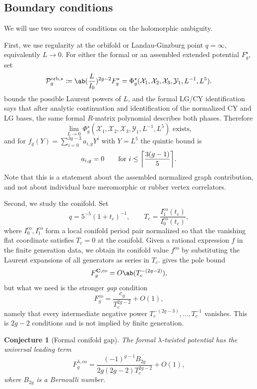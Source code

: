 \documentclass{amsart}
\newtheorem{conj}[thm]{Conjecture}
\theoremstyle{definition}
\theoremstyle{remark}
\theoremstyle{plain}
\theoremstyle{definition}
\theoremstyle{remark}
\DeclarePairedDelimiter{\ceil}{\lceil}{\rceil}
\newcommand{\mc}[1]{\mathcal{#1}}
\newcommand{\mbf}[1]{\mathbf{#1}}
\newcommand{\mr}[1]{\mathrm{#1}}
\newcommand{\1}{\mathbf{1}}
\newcommand{\2}{\mathbf{2}}
\newcommand{\3}{\mathbf{3}}
\begin{document}
\subsection{Boundary conditions}%
\label{sub:Boundary conditions}

We will use two sources of conditions on the holomorphic ambiguity.

First, we use regularity at the orbifold or Landau-Ginzburg point \(q = \infty\), equivalently \(L \to 0\). For either the formal or an assembled extended potential \(F_g^{\star}\), set
\[ \mc{P}_g^{\mr{orb},\star} \coloneqq \ab(\frac{L}{I_0})^{2g-2}F_g^{\star} = \Phi_g^{\star}(\mc{X}_1,\mc{X}_2,\mc{X}_3,\mc{Y}_1,L^{-1},L^5). \]
 bounds the possible Laurent powers of \(L\), and the formal LG/CY identification says that after analytic continuation and identification of the normalized CY and LG bases, the same formal \(R\)-matrix polynomial describes both phases. Therefore
\[ \lim_{L\to0}\Phi_g^{\star}(\mc{X}_1,\mc{X}_2,\mc{X}_3,\mc{Y}_1,L^{-1},L^5) \text{ exists}, \]
and for \(f_g(Y) = \sum_{i=0}^{3g-3}a_{i,g}Y^i\) with \(Y = L^5\) the quintic bound is
\[ a_{i,g} = 0 \qquad \text{for } i \leq \ceil*{\frac{3(g-1)}{5}}. \]
Note that this is a statement about the assembled normalized graph contribution, and not about individual bare meromorphic or rubber vertex correlators.

Second, we study the conifold. Set
\[ q = 5^{-5}(1+t_c)^{-1}, \qquad T_c = \frac{I_1^{\mr{co}}(t_c)}{I_0^{\mr{co}}(t_c)}, \]
where \(I_0^{\mr{co}}, I_1^{\mr{co}}\) form a local conifold period pair normalized so that the vanishing flat coordinate satisfies \(T_c = 0\) at the conifold. Given a rational expression \(f\) in the finite generation data, we obtain its conifold value \(f^{\mr{co}}\) by substituting the Laurent expansions of all generators as series in \(T_c\).  gives the pole bound
\[ F_g^{\mbf{C},\mr{co}} = O\ab(T_c^{-(2g-2)}), \]
but what we need is the stronger \textit{gap} condition
\[ F_g^{\mr{co}} = \frac{c_g}{T_c^{2g-2}} + O(1), \]
namely that every intermediate negative power \(T_c^{-(2g-3)}, \ldots, T_c^{-1}\) vanishes. This is \(2g-2\) conditions and is not implied by finite generation.

\begin{conj}[Formal conifold gap]%
\label{conj:formal conifold gap}
    The formal \(\lambda\)-twisted potential has the universal leading term
    \[ F_g^{\lambda,\mr{co}} = \frac{(-1)^{g-1}B_{2g}}{2g(2g-2)T_c^{2g-2}} + O(1), \]
    where \(B_{2g}\) is a Bernoulli number.
\end{conj}
\end{document}
